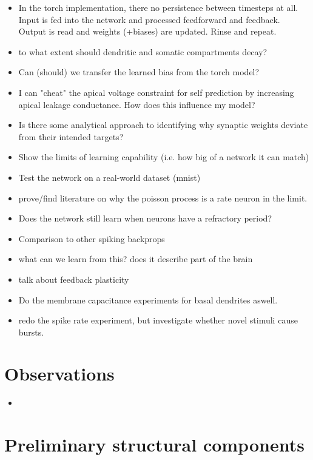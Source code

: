 \begin{itemize}
    \item In the torch implementation, there no persistence between timesteps at all. Input is fed into the network and
    processed feedforward and feedback. Output is read and weights (+biases) are updated. Rinse and repeat.
    \item to what extent should dendritic and somatic compartments decay?
    \item Can (should) we transfer the learned bias from the torch model?
    \item I can "cheat" the apical voltage constraint for self prediction by increasing apical leakage conductance. How
    does this influence my model?
    \item Is there some analytical approach to identifying why synaptic weights deviate from their intended targets?

    \item Show the limits of learning capability (i.e. how big of a network it can match)
    \item Test the network on a real-world dataset (mnist)
    \item prove/find literature on why the poisson process is a rate neuron in the limit.
    \item Does the network still learn when neurons have a refractory period?
    \item Comparison to other spiking backprops
    \item what can we learn from this? does it describe part of the brain
    \item talk about feedback plasticity
    \item Do the membrane capacitance experiments for basal dendrites aswell.
    \item redo the spike rate experiment, but investigate whether novel stimuli cause bursts.
\end{itemize}

\section{Observations}

\begin{itemize}
    \item 
\end{itemize}


\section{Preliminary structural components}

